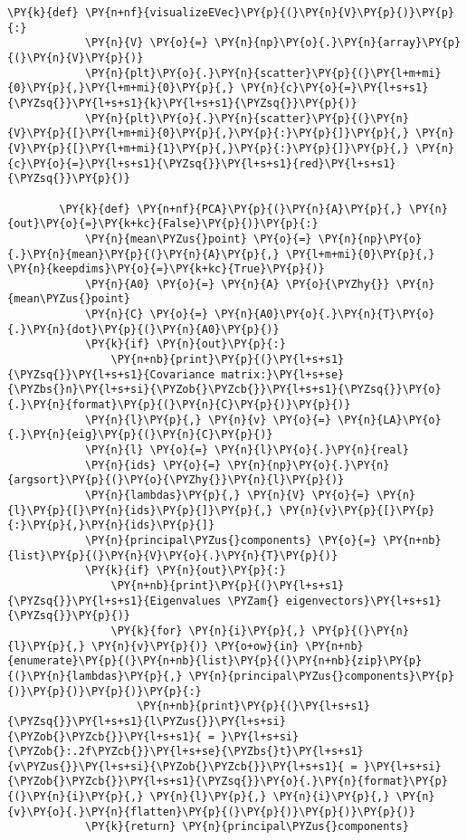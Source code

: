\begin{Verbatim}[commandchars=\\\{\}]
        \PY{k}{def} \PY{n+nf}{visualizeEVec}\PY{p}{(}\PY{n}{V}\PY{p}{)}\PY{p}{:}
            \PY{n}{V} \PY{o}{=} \PY{n}{np}\PY{o}{.}\PY{n}{array}\PY{p}{(}\PY{n}{V}\PY{p}{)}
            \PY{n}{plt}\PY{o}{.}\PY{n}{scatter}\PY{p}{(}\PY{l+m+mi}{0}\PY{p}{,}\PY{l+m+mi}{0}\PY{p}{,} \PY{n}{c}\PY{o}{=}\PY{l+s+s1}{\PYZsq{}}\PY{l+s+s1}{k}\PY{l+s+s1}{\PYZsq{}}\PY{p}{)}
            \PY{n}{plt}\PY{o}{.}\PY{n}{scatter}\PY{p}{(}\PY{n}{V}\PY{p}{[}\PY{l+m+mi}{0}\PY{p}{,}\PY{p}{:}\PY{p}{]}\PY{p}{,} \PY{n}{V}\PY{p}{[}\PY{l+m+mi}{1}\PY{p}{,}\PY{p}{:}\PY{p}{]}\PY{p}{,} \PY{n}{c}\PY{o}{=}\PY{l+s+s1}{\PYZsq{}}\PY{l+s+s1}{red}\PY{l+s+s1}{\PYZsq{}}\PY{p}{)}
        
        \PY{k}{def} \PY{n+nf}{PCA}\PY{p}{(}\PY{n}{A}\PY{p}{,} \PY{n}{out}\PY{o}{=}\PY{k+kc}{False}\PY{p}{)}\PY{p}{:}
            \PY{n}{mean\PYZus{}point} \PY{o}{=} \PY{n}{np}\PY{o}{.}\PY{n}{mean}\PY{p}{(}\PY{n}{A}\PY{p}{,} \PY{l+m+mi}{0}\PY{p}{,} \PY{n}{keepdims}\PY{o}{=}\PY{k+kc}{True}\PY{p}{)}
            \PY{n}{A0} \PY{o}{=} \PY{n}{A} \PY{o}{\PYZhy{}} \PY{n}{mean\PYZus{}point}
            \PY{n}{C} \PY{o}{=} \PY{n}{A0}\PY{o}{.}\PY{n}{T}\PY{o}{.}\PY{n}{dot}\PY{p}{(}\PY{n}{A0}\PY{p}{)}
            \PY{k}{if} \PY{n}{out}\PY{p}{:}
                \PY{n+nb}{print}\PY{p}{(}\PY{l+s+s1}{\PYZsq{}}\PY{l+s+s1}{Covariance matrix:}\PY{l+s+se}{\PYZbs{}n}\PY{l+s+si}{\PYZob{}\PYZcb{}}\PY{l+s+s1}{\PYZsq{}}\PY{o}{.}\PY{n}{format}\PY{p}{(}\PY{n}{C}\PY{p}{)}\PY{p}{)}
            \PY{n}{l}\PY{p}{,} \PY{n}{v} \PY{o}{=} \PY{n}{LA}\PY{o}{.}\PY{n}{eig}\PY{p}{(}\PY{n}{C}\PY{p}{)}
            \PY{n}{l} \PY{o}{=} \PY{n}{l}\PY{o}{.}\PY{n}{real}
            \PY{n}{ids} \PY{o}{=} \PY{n}{np}\PY{o}{.}\PY{n}{argsort}\PY{p}{(}\PY{o}{\PYZhy{}}\PY{n}{l}\PY{p}{)}
            \PY{n}{lambdas}\PY{p}{,} \PY{n}{V} \PY{o}{=} \PY{n}{l}\PY{p}{[}\PY{n}{ids}\PY{p}{]}\PY{p}{,} \PY{n}{v}\PY{p}{[}\PY{p}{:}\PY{p}{,}\PY{n}{ids}\PY{p}{]}
            \PY{n}{principal\PYZus{}components} \PY{o}{=} \PY{n+nb}{list}\PY{p}{(}\PY{n}{V}\PY{o}{.}\PY{n}{T}\PY{p}{)}
            \PY{k}{if} \PY{n}{out}\PY{p}{:}
                \PY{n+nb}{print}\PY{p}{(}\PY{l+s+s1}{\PYZsq{}}\PY{l+s+s1}{Eigenvalues \PYZam{} eigenvectors}\PY{l+s+s1}{\PYZsq{}}\PY{p}{)}
                \PY{k}{for} \PY{n}{i}\PY{p}{,} \PY{p}{(}\PY{n}{l}\PY{p}{,} \PY{n}{v}\PY{p}{)} \PY{o+ow}{in} \PY{n+nb}{enumerate}\PY{p}{(}\PY{n+nb}{list}\PY{p}{(}\PY{n+nb}{zip}\PY{p}{(}\PY{n}{lambdas}\PY{p}{,} \PY{n}{principal\PYZus{}components}\PY{p}{)}\PY{p}{)}\PY{p}{)}\PY{p}{:}
                    \PY{n+nb}{print}\PY{p}{(}\PY{l+s+s1}{\PYZsq{}}\PY{l+s+s1}{l\PYZus{}}\PY{l+s+si}{\PYZob{}\PYZcb{}}\PY{l+s+s1}{ = }\PY{l+s+si}{\PYZob{}:.2f\PYZcb{}}\PY{l+s+se}{\PYZbs{}t}\PY{l+s+s1}{v\PYZus{}}\PY{l+s+si}{\PYZob{}\PYZcb{}}\PY{l+s+s1}{ = }\PY{l+s+si}{\PYZob{}\PYZcb{}}\PY{l+s+s1}{\PYZsq{}}\PY{o}{.}\PY{n}{format}\PY{p}{(}\PY{n}{i}\PY{p}{,} \PY{n}{l}\PY{p}{,} \PY{n}{i}\PY{p}{,} \PY{n}{v}\PY{o}{.}\PY{n}{flatten}\PY{p}{(}\PY{p}{)}\PY{p}{)}\PY{p}{)}
            \PY{k}{return} \PY{n}{principal\PYZus{}components}
        

\end{Verbatim}

